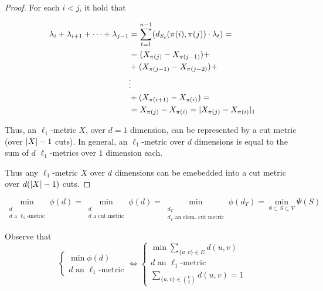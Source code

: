 \begin{proof}
        For each $i < j$, it hold that

        \begin{equation*}
            \begin{split}
                \lambda_i  + \lambda_{i+1} + \cdots + \lambda_{j-1} &= \sum_{t=1}^{n-1}(d_{S_t}(\pi(i), \pi(j)) \cdot \lambda_t) =\\
                    &= (X_{\pi(j)} - X_{\pi(j-1)}) +\\
                    &+ (X_{\pi(j-1)} - X_{\pi(j-2)}) +\\
                    & \vdots\\
                    &+ (X_{\pi(i+1)} - X_{\pi(i)}) =\\
                    &= X_{\pi(j)} - X_{\pi(i)} = \vert X_{\pi(j)} - X_{\pi(i)} \vert_1
            \end{split}
        \end{equation*}

        Thus, an $\ell_1$-metric $X$, over $d=1$ dimension, can be represented by a cut metric (over $\vert X \vert-1$ cuts).
        In general, an $\ell_1$-metric over $d$ dimensions is equal to the sum of $d$ $\ell_1$-metrics over $1$ dimension each.

        Thus any $\ell_1$-metric $X$ over $d$ dimensions can be emebedded into a cut metric over $d(\vert X \vert-1)$ cuts.
    \end{proof}

    \begin{corollary}
        \[ \min_{\substack{d\\ d \text{ a } \ell_1 \text{-metric}}} \phi(d) = \min_{\substack{d\\ d \text{  a cut metric}}} \phi(d) = \min_{\substack{d_T\\ d_T \text{ an elem. cut metric}}} \phi(d_T) = \min_{\emptyset \subset S \subset V} \Psi(S)  \]
    \end{corollary}

    Observe that
    \begin{equation}
        \begin{cases}
            \min \phi(d)\\
            d \text{ an } \ell_1 \text{-metric}
        \end{cases}
        \Longleftrightarrow
        \begin{cases}
            \min \sum_{\{u,v\} \in E} d(u,v)\\
            d \text{ an } \ell_1 \text{-metric}\\
            \sum_{\{u,v\} \in \binom{V}{2}} d(u,v) = 1
        \end{cases}
    \end{equation}

